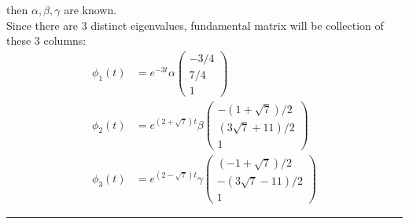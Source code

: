 \documentclass[12pt, letterpaper]{scrartcl}
\begin{document}
then $\alpha, \beta, \gamma$ are known.\\
Since there are 3 distinct eigenvalues, fundamental matrix will be collection of these 3 columns:
\begin{align*}
    \phi_1(t)&=e^{-3t}\alpha\left(\begin{array}{c} -3/4 \\ 7/4 \\ 1 \end{array}\right)\\
    \phi_2(t)&=e^{(2+\sqrt{7})t}\beta\left(\begin{array}{c} -(1+\sqrt{7})/2 \\ (3\sqrt{7}+11)/2 \\ 1 \end{array}\right)\\
    \phi_3(t)&=e^{(2-\sqrt{7})t}\gamma\left(\begin{array}{c} (-1+\sqrt{7})/2 \\ -(3\sqrt{7}-11)/2 \\ 1 \end{array}\right)
\end{align*}
\vskip1mm\hrule
\end{document}
